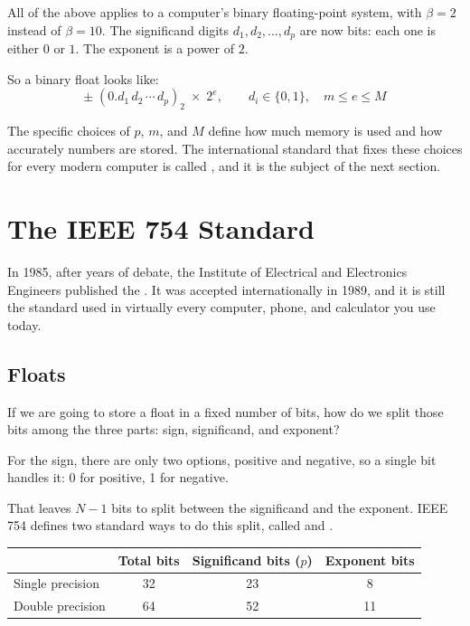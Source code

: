 All of the above applies to a computer's binary floating-point system,
with $\beta = 2$ instead of $\beta = 10$.
The significand digits $d_1, d_2, \ldots, d_p$ are now bits: each one is either
$0$ or $1$.
The exponent is a power of $2$.

So a binary float looks like:
\[
  \pm \;(0.d_1\, d_2\, \cdots\, d_p)_2 \;\times\; 2^e,
  \qquad d_i \in \{0,1\}, \quad m \leq e \leq M
\]

The specific choices of $p$, $m$, and $M$ define how much memory is used and
how accurately numbers are stored.
The international standard that fixes these choices for every modern computer
is called , and it is the subject of the next
section.

\section{The IEEE 754 Standard}

In 1985, after years of debate, the Institute of Electrical
and Electronics Engineers published the
. It was accepted internationally
in 1989, and it is still the standard used in virtually every computer, phone, and
calculator you use today. 

\subsection{Floats}

If we are going to store a float in a fixed number of bits, how do we split those bits
among the three parts: sign, significand, and exponent?

For the sign, there are only two options, positive and negative, so a single bit
handles it: 0 for positive, 1 for negative.

That leaves $N - 1$ bits to split between the significand and the exponent. IEEE 754
defines two standard ways to do this split, called
 and
.

\begin{center}
\begin{tabular}{lccc}
    \hline
    & Total bits & Significand bits ($p$) & Exponent bits \\
    \hline
    Single precision & 32 & 23 & 8 \\
    Double precision & 64 & 52 & 11 \\
    \hline
\end{tabular}
\end{center}

